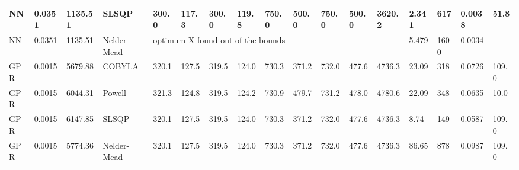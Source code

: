 \begin{tabular}{|lllllllllllllllll|}
\multicolumn{1}{|l|}{NN} & \multicolumn{1}{l|}{0.0351} & \multicolumn{1}{l|}{1135.51} & \multicolumn{1}{l|}{SLSQP} & \multicolumn{1}{l|}{300.0} & \multicolumn{1}{l|}{117.3} & \multicolumn{1}{l|}{300.0} & \multicolumn{1}{l|}{119.8} & \multicolumn{1}{l|}{750.0} & \multicolumn{1}{l|}{500.0} & \multicolumn{1}{l|}{750.0} & \multicolumn{1}{l|}{500.0} & \multicolumn{1}{l|}{3620.2} & \multicolumn{1}{l|}{2.341} & \multicolumn{1}{l|}{617} & \multicolumn{1}{l|}{0.0038} & 51.8 \\ \hline
\multicolumn{1}{|l|}{NN} & \multicolumn{1}{l|}{0.0351} & \multicolumn{1}{l|}{1135.51} & \multicolumn{1}{l|}{Nelder-Mead} & \multicolumn{8}{l|}{optimum X found out of the bounds} & \multicolumn{1}{l|}{-} & \multicolumn{1}{l|}{5.479} & \multicolumn{1}{l|}{1600} & \multicolumn{1}{l|}{0.0034} & - \\ \hline
\multicolumn{1}{|l|}{GPR} & \multicolumn{1}{l|}{0.0015} & \multicolumn{1}{l|}{5679.88} & \multicolumn{1}{l|}{COBYLA} & \multicolumn{1}{l|}{320.1} & \multicolumn{1}{l|}{127.5} & \multicolumn{1}{l|}{319.5} & \multicolumn{1}{l|}{124.0} & \multicolumn{1}{l|}{730.3} & \multicolumn{1}{l|}{371.2} & \multicolumn{1}{l|}{732.0} & \multicolumn{1}{l|}{477.6} & \multicolumn{1}{l|}{4736.3} & \multicolumn{1}{l|}{23.09} & \multicolumn{1}{l|}{318} & \multicolumn{1}{l|}{0.0726} & 109.0 \\ \hline
\multicolumn{1}{|l|}{GPR} & \multicolumn{1}{l|}{0.0015} & \multicolumn{1}{l|}{6044.31} & \multicolumn{1}{l|}{Powell} & \multicolumn{1}{l|}{321.3} & \multicolumn{1}{l|}{124.8} & \multicolumn{1}{l|}{319.5} & \multicolumn{1}{l|}{124.2} & \multicolumn{1}{l|}{730.9} & \multicolumn{1}{l|}{479.7} & \multicolumn{1}{l|}{731.2} & \multicolumn{1}{l|}{478.0} & \multicolumn{1}{l|}{4780.6} & \multicolumn{1}{l|}{22.09} & \multicolumn{1}{l|}{348} & \multicolumn{1}{l|}{0.0635} & 10.0 \\ \hline
\multicolumn{1}{|l|}{GPR} & \multicolumn{1}{l|}{0.0015} & \multicolumn{1}{l|}{6147.85} & \multicolumn{1}{l|}{SLSQP} & \multicolumn{1}{l|}{320.1} & \multicolumn{1}{l|}{127.5} & \multicolumn{1}{l|}{319.5} & \multicolumn{1}{l|}{124.0} & \multicolumn{1}{l|}{730.3} & \multicolumn{1}{l|}{371.2} & \multicolumn{1}{l|}{732.0} & \multicolumn{1}{l|}{477.6} & \multicolumn{1}{l|}{4736.3} & \multicolumn{1}{l|}{8.74} & \multicolumn{1}{l|}{149} & \multicolumn{1}{l|}{0.0587} & 109.0 \\ \hline
\multicolumn{1}{|l|}{GPR} & \multicolumn{1}{l|}{0.0015} & \multicolumn{1}{l|}{5774.36} & \multicolumn{1}{l|}{Nelder-Mead} & \multicolumn{1}{l|}{320.1} & \multicolumn{1}{l|}{127.5} & \multicolumn{1}{l|}{319.5} & \multicolumn{1}{l|}{124.0} & \multicolumn{1}{l|}{730.3} & \multicolumn{1}{l|}{371.2} & \multicolumn{1}{l|}{732.0} & \multicolumn{1}{l|}{477.6} & \multicolumn{1}{l|}{4736.3} & \multicolumn{1}{l|}{86.65} & \multicolumn{1}{l|}{878} & \multicolumn{1}{l|}{0.0987} & 109.0 \\ \hline

\end{tabular}
